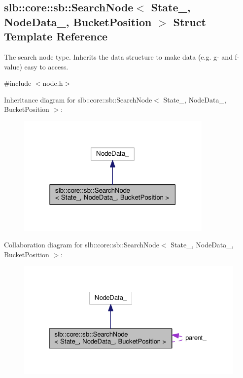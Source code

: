 \hypertarget{structslb_1_1core_1_1sb_1_1SearchNode}{}\subsection{slb\+:\+:core\+:\+:sb\+:\+:Search\+Node$<$ State\+\_\+, Node\+Data\+\_\+, Bucket\+Position $>$ Struct Template Reference}
\label{structslb_1_1core_1_1sb_1_1SearchNode}


The search node type. Inherits the data structure to make data (e.\+g. g-\/ and f-\/value) easy to access.  




{\ttfamily \#include $<$node.\+h$>$}



Inheritance diagram for slb\+:\+:core\+:\+:sb\+:\+:Search\+Node$<$ State\+\_\+, Node\+Data\+\_\+, Bucket\+Position $>$\+:\nopagebreak
\begin{figure}[H]
\begin{center}
\leavevmode
\includegraphics[width=271pt]{structslb_1_1core_1_1sb_1_1SearchNode__inherit__graph}
\end{center}
\end{figure}


Collaboration diagram for slb\+:\+:core\+:\+:sb\+:\+:Search\+Node$<$ State\+\_\+, Node\+Data\+\_\+, Bucket\+Position $>$\+:\nopagebreak
\begin{figure}[H]
\begin{center}
\leavevmode
\includegraphics[width=325pt]{structslb_1_1core_1_1sb_1_1SearchNode__coll__graph}
\end{center}
\end{figure}
